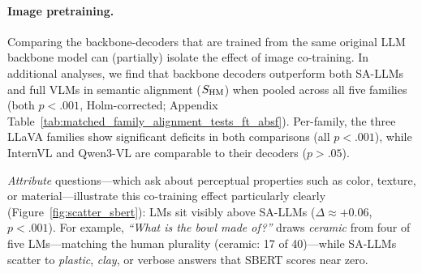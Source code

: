 \documentclass[letterpaper]{article}
\begin{document}


\paragraph{Image pretraining.}
Comparing the backbone-decoders that are trained from the same original LLM backbone model can (partially) isolate the effect of image co-training. %
In additional analyses, we find that backbone decoders outperform both SA-LLMs and full VLMs in semantic alignment ($\sHM$) when pooled across all five families (both $p{<}.001$, Holm-corrected; Appendix Table~\ref{tab:matched_family_alignment_tests_ft_absf}). Per-family, the three LLaVA families show significant deficits in both comparisons (all $p{<}.001$), while InternVL and Qwen3-VL are comparable to their decoders ($p{>}.05$).   

\textit{Attribute} questions---which ask about perceptual properties such as color, texture, or material---illustrate this co-training effect particularly clearly (Figure~\ref{fig:scatter_sbert}): LMs sit visibly above SA-LLMs ($\Delta{\approx}{+}0.06$, $p{<}.001$).
For example, \textit{``What is the bowl made of?''} draws \textit{ceramic} from four of five LMs---matching the human plurality (ceramic: 17 of 40)---while SA-LLMs scatter to \textit{plastic}, \textit{clay}, or verbose answers that SBERT scores near zero. %
\end{document}
